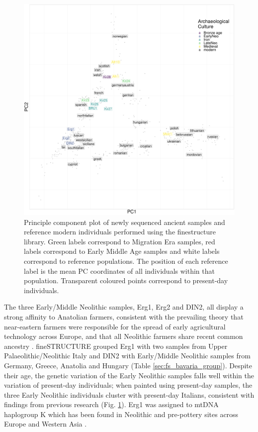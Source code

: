 \begin{figure}[htp]
    \centering
    \includegraphics[width=1.0\textwidth]{../images/chapter4/chunklengths_moderns_ancients_PCA.pdf}
    \caption{Principle component plot of newly sequenced ancient samples and reference modern individuals performed using the finestructure library. Green labels correspond to Migration Era samples, red labels correspond to Early Middle Age samples and white labels correspond to reference populations. The position of each reference label is the mean PC coordinates of all individuals within that population. Transparent coloured points correspond to present-day individuals.}
    \label{fig:chunklengths_moderns_ancients_PCA_bav}
\end{figure}

The three Early/Middle Neolithic samples, Erg1, Erg2 and DIN2, all display a strong affinity to Anatolian farmers, consistent with the prevailing theory that near-eastern farmers were responsible for the spread of early agricultural technology across Europe, and that all Neolithic farmers share recent common ancestry \cite{Haak2010, haak2005ancient, bramanti2009genetic, Lazaridis2014}. fineSTRUCTURE  grouped Erg1 with two samples from Upper Palaeolithic/Neolithic Italy and DIN2 with Early/Middle Neolithic samples from Germany, Greece, Anatolia and Hungary (Table \ref{sec:fs_bavaria_group}). Despite their age, the genetic variation of the Early Neolithic samples falls well within the variation of present-day individuals; when painted using present-day samples, the three Early Neolithic individuals cluster with present-day Italians, consistent with findings from previous research \cite{Lazaridis2014, Haak2015} (Fig. \ref{fig:chunklengths_moderns_ancients_PCA_bav}). Erg1 was assigned to mtDNA haplogroup K which has been found in Neolithic and pre-pottery sites across Europe \cite{Hofmanova2016, fernandez2014ancient} and Western Asia \cite{Lazaridis2016, Mathieson2015}. 

